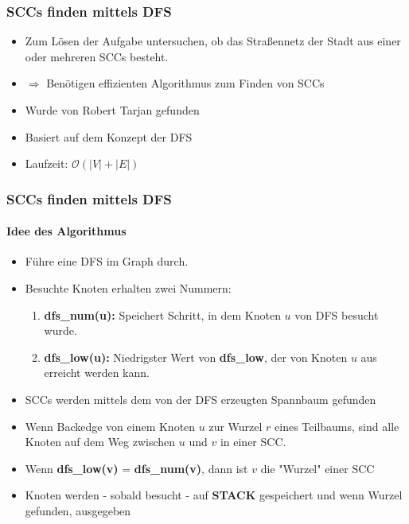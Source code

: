 \begin{frame}
	\frametitle{SCCs finden mittels DFS}
	\begin{itemize}
		\item Zum Lösen der Aufgabe untersuchen, ob das Straßennetz der Stadt aus einer oder mehreren SCCs besteht.
		\item $\Rightarrow$ Benötigen effizienten Algorithmus zum Finden von SCCs 
	\end{itemize}	
	\pause
	\begin{itemize}
		\item Wurde von Robert Tarjan gefunden
		\item Basiert auf dem Konzept der DFS
		\item Laufzeit: $\mathcal{O}(|V| + |E|)$
	\end{itemize}
\end{frame}
\begin{frame}
\frametitle{SCCs finden mittels DFS}
\framesubtitle{Idee des Algorithmus}
	\begin{itemize}
		\item Führe eine DFS im Graph durch.
		\item Besuchte Knoten erhalten zwei Nummern:
		\pause
			\begin{enumerate}
				\item \textbf{dfs\_num(u):} Speichert Schritt, in dem Knoten $u$ von DFS besucht wurde.
				\item \textbf{dfs\_low(u):} Niedrigster Wert von \textbf{dfs\_low}, der von Knoten $u$ aus erreicht werden kann. 
			\end{enumerate}
		\pause
		\item SCCs werden mittels dem von der DFS erzeugten Spannbaum gefunden
		\pause
		\item Wenn Backedge von einem Knoten $u$ zur Wurzel $r$ eines Teilbaums, sind alle Knoten auf \newline
		dem Weg zwischen $u$ und $v$ in einer SCC.
		\pause
		\item Wenn \textbf{dfs\_low(v)} =  \textbf{dfs\_num(v)}, dann ist $v$ die "Wurzel" einer SCC
		\pause
		\item Knoten werden - sobald besucht - auf \textbf{STACK} gespeichert und wenn Wurzel gefunden, ausgegeben
	\end{itemize}
\end{frame}

